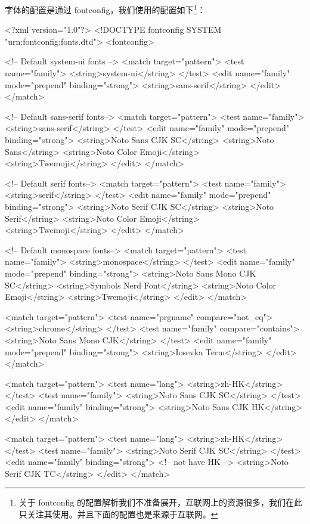 字体的配置是通过 fontconfig，我们使用的配置如下\footnote{关于 fontconfig 的配置解析我们不准备展开，互联网上的资源很多，我们在此只关注其使用。并且下面的配置也是来源于互联网。}：
\begin{lstcode}[numbers=none]
<?xml version="1.0"?>
<!DOCTYPE fontconfig SYSTEM "urn:fontconfig:fonts.dtd">
<fontconfig>

  <!-- Default system-ui fonts -->
  <match target="pattern">
    <test name="family">
      <string>system-ui</string>
    </test>
    <edit name="family" mode="prepend" binding="strong">
      <string>sans-serif</string>
    </edit>
  </match>

  <!-- Default sans-serif fonts-->
  <match target="pattern">
    <test name="family">
      <string>sans-serif</string>
    </test>
    <edit name="family" mode="prepend" binding="strong">
      <string>Noto Sans CJK SC</string>
      <string>Noto Sans</string>
      <string>Noto Color Emoji</string>
      <string>Twemoji</string>
    </edit>
  </match>

  <!-- Default serif fonts-->
  <match target="pattern">
    <test name="family">
      <string>serif</string>
    </test>
    <edit name="family" mode="prepend" binding="strong">
      <string>Noto Serif CJK SC</string>
      <string>Noto Serif</string>
      <string>Noto Color Emoji</string>
      <string>Twemoji</string>
    </edit>
  </match>

  <!-- Default monospace fonts-->
  <match target="pattern">
    <test name="family">
      <string>monospace</string>
    </test>
    <edit name="family" mode="prepend" binding="strong">
      <string>Noto Sans Mono CJK SC</string>
      <string>Symbols Nerd Font</string>
      <string>Noto Color Emoji</string>
      <string>Twemoji</string>
    </edit>
  </match>

  <match target="pattern">
    <test name="prgname" compare="not_eq">
      <string>chrome</string>
    </test>
    <test name="family" compare="contains">
      <string>Noto Sans Mono CJK</string>
    </test>
    <edit name="family" mode="prepend" binding="strong">
      <string>Iosevka Term</string>
    </edit>
  </match>


  <match target="pattern">
    <test name="lang">
      <string>zh-HK</string>
    </test>
    <test name="family">
      <string>Noto Sans CJK SC</string>
    </test>
    <edit name="family" binding="strong">
      <string>Noto Sans CJK HK</string>
    </edit>
  </match>

  <match target="pattern">
    <test name="lang">
      <string>zh-HK</string>
    </test>
    <test name="family">
      <string>Noto Serif CJK SC</string>
    </test>
    <edit name="family" binding="strong">
      <!-- not have HK -->
      <string>Noto Serif CJK TC</string>
    </edit>
  </match>


\end{lstcode}
